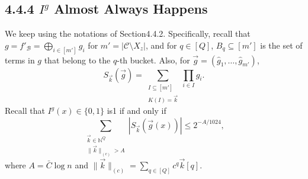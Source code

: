 \subsection*{4.4.4 $I^g$ Almost Always Happens}
We keep using the notations of Section4.4.2. Specifically, recall that $g=f'_{\mathcal B}=\bigoplus_{i\in[m']}g_i$ for $m'=|\mathcal C\setminus X_z|$, and for $q\in[Q]$, $B_q\subseteq[m']$ is the set of terms in $g$ that belong to the $q$-th bucket. Also, for $\vec g=(\widehat g_1,\ldots,\widehat g_{m'})$,
\[
S_{\vec k}(\vec g)=\sum_{\substack{I\subseteq[m']\\K(I)=\vec k}}\prod_{i\in I}\widehat g_i.
\]
Recall that $I^g(x)\in\{0,1\}$ is1 if and only if
\[
\sum_{\substack{\vec k\in\mathbb N^Q\\\|\vec k\|_{(c)}>A}}|S_{\vec k}(\vec g(x))|\le2^{-A/1024},
\]
where $A=\bar C\log n$ and $\|\vec k\|_{(c)}=\sum_{q\in[Q]}c^q\vec k[q]$.
